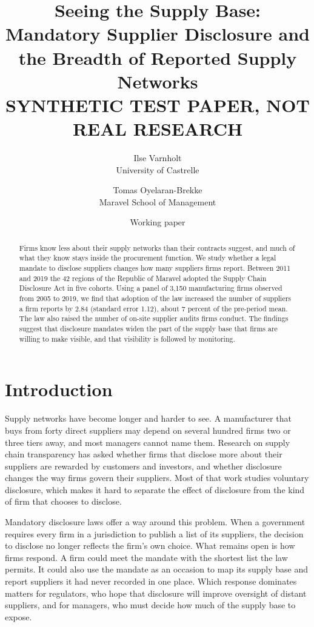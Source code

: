 \documentclass[11pt]{article}
\title{Seeing the Supply Base: Mandatory Supplier Disclosure and the Breadth of Reported Supply Networks\\[0.6em]
\large\textbf{SYNTHETIC TEST PAPER, NOT REAL RESEARCH}}
\author{Ilse Varnholt\\University of Castrelle \and Tomas Oyelaran-Brekke\\Maravel School of Management}
\date{Working paper}
\begin{document}
\maketitle

\begin{abstract}
\noindent Firms know less about their supply networks than their contracts suggest, and much of what they know stays inside the procurement function. We study whether a legal mandate to disclose suppliers changes how many suppliers firms report. Between 2011 and 2019 the 42 regions of the Republic of Maravel adopted the Supply Chain Disclosure Act in five cohorts. Using a panel of 3,150 manufacturing firms observed from 2005 to 2019, we find that adoption of the law increased the number of suppliers a firm reports by 2.84 (standard error 1.12), about 7 percent of the pre-period mean. The law also raised the number of on-site supplier audits firms conduct. The findings suggest that disclosure mandates widen the part of the supply base that firms are willing to make visible, and that visibility is followed by monitoring.
\end{abstract}

\section{Introduction}

Supply networks have become longer and harder to see. A manufacturer that buys from forty direct suppliers may depend on several hundred firms two or three tiers away, and most managers cannot name them. Research on supply chain transparency has asked whether firms that disclose more about their suppliers are rewarded by customers and investors, and whether disclosure changes the way firms govern their suppliers. Most of that work studies voluntary disclosure, which makes it hard to separate the effect of disclosure from the kind of firm that chooses to disclose.

Mandatory disclosure laws offer a way around this problem. When a government requires every firm in a jurisdiction to publish a list of its suppliers, the decision to disclose no longer reflects the firm's own choice. What remains open is how firms respond. A firm could meet the mandate with the shortest list the law permits. It could also use the mandate as an occasion to map its supply base and report suppliers it had never recorded in one place. Which response dominates matters for regulators, who hope that disclosure will improve oversight of distant suppliers, and for managers, who must decide how much of the supply base to expose.
\end{document}
